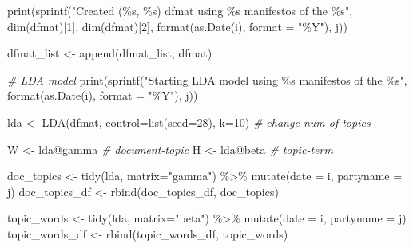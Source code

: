 \documentclass[
]{article}
\newenvironment{Shaded}{\begin{snugshade}}{\end{snugshade}}
\newcommand{\AttributeTok}[1]{\textcolor[rgb]{0.77,0.63,0.00}{#1}}
\newcommand{\CommentTok}[1]{\textcolor[rgb]{0.56,0.35,0.01}{\textit{#1}}}
\newcommand{\DecValTok}[1]{\textcolor[rgb]{0.00,0.00,0.81}{#1}}
\newcommand{\FunctionTok}[1]{\textcolor[rgb]{0.00,0.00,0.00}{#1}}
\newcommand{\NormalTok}[1]{#1}
\newcommand{\OtherTok}[1]{\textcolor[rgb]{0.56,0.35,0.01}{#1}}
\newcommand{\SpecialCharTok}[1]{\textcolor[rgb]{0.00,0.00,0.00}{#1}}
\newcommand{\StringTok}[1]{\textcolor[rgb]{0.31,0.60,0.02}{#1}}
\begin{document}
\begin{Shaded}
\begin{Highlighting}[]
      \FunctionTok{print}\NormalTok{(}\FunctionTok{sprintf}\NormalTok{(}\StringTok{"Created (\%s, \%s) dfmat using \%s manifestos of the \%s"}\NormalTok{, }
                   \FunctionTok{dim}\NormalTok{(dfmat)[}\DecValTok{1}\NormalTok{], }\FunctionTok{dim}\NormalTok{(dfmat)[}\DecValTok{2}\NormalTok{], }\FunctionTok{format}\NormalTok{(}\FunctionTok{as.Date}\NormalTok{(i), }\AttributeTok{format =} \StringTok{"\%Y"}\NormalTok{), j))}
      
\NormalTok{      dfmat\_list }\OtherTok{\textless{}{-}} \FunctionTok{append}\NormalTok{(dfmat\_list, dfmat)}
      
      
      \CommentTok{\# LDA model}
      \FunctionTok{print}\NormalTok{(}\FunctionTok{sprintf}\NormalTok{(}\StringTok{"Starting LDA model using \%s manifestos of the \%s"}\NormalTok{, }
                    \FunctionTok{format}\NormalTok{(}\FunctionTok{as.Date}\NormalTok{(i), }\AttributeTok{format =} \StringTok{"\%Y"}\NormalTok{), j))}
      
\NormalTok{      lda }\OtherTok{\textless{}{-}} \FunctionTok{LDA}\NormalTok{(dfmat, }\AttributeTok{control=}\FunctionTok{list}\NormalTok{(}\AttributeTok{seed=}\DecValTok{28}\NormalTok{), }\AttributeTok{k=}\DecValTok{10}\NormalTok{) }\CommentTok{\# change num of topics}
  
\NormalTok{      W }\OtherTok{\textless{}{-}}\NormalTok{ lda}\SpecialCharTok{@}\NormalTok{gamma }\CommentTok{\# document{-}topic}
\NormalTok{      H }\OtherTok{\textless{}{-}}\NormalTok{ lda}\SpecialCharTok{@}\NormalTok{beta }\CommentTok{\# topic{-}term}
      
\NormalTok{      doc\_topics }\OtherTok{\textless{}{-}} \FunctionTok{tidy}\NormalTok{(lda, }\AttributeTok{matrix=}\StringTok{"gamma"}\NormalTok{) }\SpecialCharTok{\%\textgreater{}\%}
        \FunctionTok{mutate}\NormalTok{(}\AttributeTok{date =}\NormalTok{ i, }\AttributeTok{partyname =}\NormalTok{ j)}
\NormalTok{      doc\_topics\_df }\OtherTok{\textless{}{-}} \FunctionTok{rbind}\NormalTok{(doc\_topics\_df, doc\_topics)}
      
      
\NormalTok{      topic\_words }\OtherTok{\textless{}{-}} \FunctionTok{tidy}\NormalTok{(lda, }\AttributeTok{matrix=}\StringTok{"beta"}\NormalTok{) }\SpecialCharTok{\%\textgreater{}\%}
        \FunctionTok{mutate}\NormalTok{(}\AttributeTok{date =}\NormalTok{ i, }\AttributeTok{partyname =}\NormalTok{ j)}
\NormalTok{      topic\_words\_df }\OtherTok{\textless{}{-}} \FunctionTok{rbind}\NormalTok{(topic\_words\_df, topic\_words)}
      

\end{Highlighting}
\end{Shaded}
\end{document}
